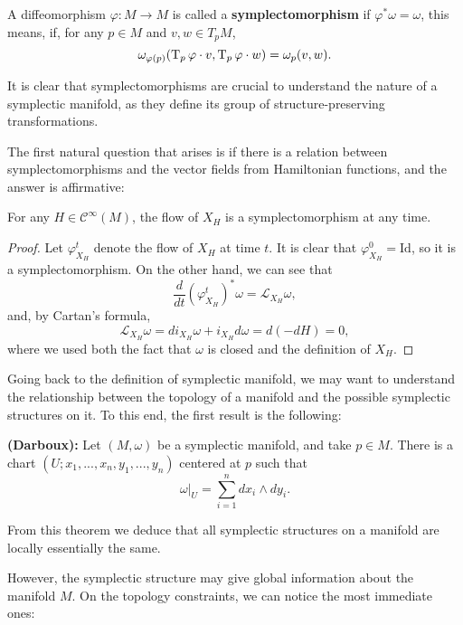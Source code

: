 \begin{deff}
A diffeomorphism $\varphi : M \rightarrow M$ is called a {\bf symplectomorphism} if $\varphi^{\ast} \omega = \omega$, this means, if, for any $p \in M$ and $v, w \in T_pM$,
\[\omega_{\varphi(p)}(\operatorname T_p \varphi \cdot v, \operatorname T_p \varphi \cdot w) = \omega_p(v,w) .\]
\end{deff}

It is clear that symplectomorphisms are crucial to understand the nature of a symplectic manifold, as they define its group of structure-preserving transformations.

The first natural question that arises is if there is a relation between symplectomorphisms and the vector fields from Hamiltonian functions, and the answer is affirmative:

\begin{prop}
For any $H \in \mathcal{C}^{\infty}(M)$, the flow of $X_H$ is a symplectomorphism at any time.
\end{prop}

\begin{proof}
Let $\varphi_{X_H}^t$ denote the flow of $X_H$ at time $t$. It is clear that $\varphi_{X_H}^0 = \text{Id}$, so it is a symplectomorphism. On the other hand, we can see that
\[\frac{d}{d t} (\varphi_{X_H}^t)^{\ast} \omega = \mathcal{L}_{X_H} \omega ,\]
and, by Cartan's formula,
\[\mathcal{L}_{X_H} \omega = d i_{X_H} \omega + i_{X_H} d \omega = d (- d H) = 0 ,\]
where we used both the fact that $\omega$ is closed and the definition of $X_H$.
\end{proof}

Going back to the definition of symplectic manifold, we may want to understand the relationship between the topology of a manifold and the possible symplectic structures on it. To this end, the first result is the following:

\begin{theo}
{\bf (Darboux):} Let $(M,\omega)$ be a symplectic manifold, and take $p \in M$. There is a chart $(U;x_1,...,x_n,y_1,...,y_n)$ centered at $p$ such that
\[\left. \omega \right|_U = \sum_{i=1}^n d x_i \wedge d y_i .\]
\end{theo}

From this theorem we deduce that all symplectic structures on a manifold are locally essentially the same.

However, the symplectic structure may give global information about the manifold $M$. On the topology constraints, we can notice the most immediate ones:

